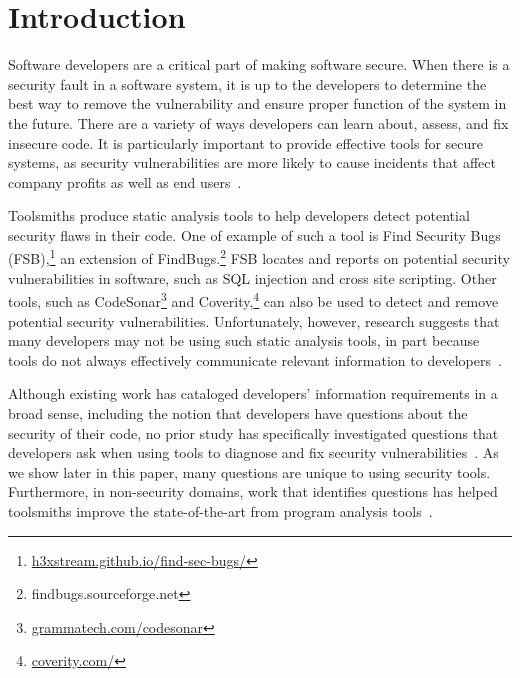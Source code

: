 \documentclass[conference]{IEEEtran}
\begin{document}
\section{Introduction}

Software developers are a critical part of making software secure. 
When there is a security fault in a software system, it is up to the developers to determine the best way to remove the vulnerability and ensure proper function of the system in the future.
There are a variety of ways developers can learn about, assess, and fix insecure code.
It is particularly important to provide effective tools for secure systems, as security vulnerabilities are more likely to cause incidents that affect company profits as well as end users~\cite{chen2002mops}. 

Toolsmiths produce static analysis tools to help developers detect potential security flaws in their code. 
One of example of such a tool is Find Security Bugs (FSB),\footnote{\url{h3xstream.github.io/find-sec-bugs/}} an extension of FindBugs.\footnote{findbugs.sourceforge.net} 
FSB locates and reports on potential security vulnerabilities in software, such as SQL injection and cross site scripting.  
Other tools, such as CodeSonar\footnote{\url{grammatech.com/codesonar}} and Coverity,\footnote{\url{coverity.com/}} can also be used to detect and remove potential security vulnerabilities.
Unfortunately, however, research suggests that many developers may not be using such static analysis tools, in part because tools do not always effectively communicate relevant information to developers~\cite{johnson2013don}. 


Although existing work has cataloged developers' information requirements in a broad sense, including the notion that developers have questions about the security of their code, no prior study has specifically investigated questions that developers ask when using tools to diagnose and fix security vulnerabilities~\cite{latoza2010hard}. 
As we show later in this paper, many questions are unique to using security tools.
Furthermore, in non-security domains, work that identifies questions has helped toolsmiths improve the state-of-the-art from program analysis tools~\cite{kononenko2012automatically, servant2012history, yoon2013visualization}. 


\end{document}

